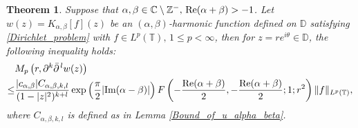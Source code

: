 \documentclass[11pt, reqno]{amsart}
\newtheorem{theorem}{Theorem}
\theoremstyle{definition}
\numberwithin{equation}{section}
\theoremstyle{remark}
\numberwithin{equation}{section}
\begin{document}
	\begin{theorem}\label{t3}
		Suppose that $\alpha, \beta\in \mathbb{C}\setminus\mathbb{Z}^-,\, \mbox{\rm Re}(\alpha+\beta)>-1$. Let $w(z)=K_{\alpha,\beta}[f](z)$ be an $(\alpha,\beta)$-harmonic function defined on $\mathbb{D}$ satisfying \eqref{Dirichlet_problem} with $f\in L^p(\mathbb{T}),\, 1\leq p< \infty$, then for $z=re^{i\theta}\in \mathbb{D}$, the following  inequality holds:		
		\begin{align*}
        \begin{split}
			&M_p\left(r, \partial^{k} \bar{\partial}^{\,l} w(z)\right)\\\leq&\frac{|c_{\alpha,\beta}|C_{\alpha,\beta,k,l}}{(1-|z|^2)^{k+l}}\exp\left(\frac{\pi}{2}| \text{\rm Im}(\alpha-\beta)|\right) F\left(-\frac{\mbox{\rm Re}(\alpha+\beta)}{2},-\frac{\mbox{\rm Re}(\alpha+\beta)}{2};1;r^2\right)\|f\|_{L^p(\mathbb{T})},
            \end{split}
		\end{align*}
        where $C_{\alpha,\beta,k,l}$ is defined as in Lemma \ref{Bound_of_u_alpha_beta}.
	\end{theorem}
\end{document}

